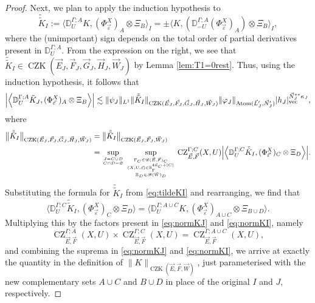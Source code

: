 \documentclass[11pt, reqno]{amsart}
\theoremstyle{definition}
\theoremstyle{remark}
\numberwithin{equation}{section}
\newcommand{\vE}{\vec E}
\newcommand{\vF}{\vec F}
\newcommand{\R}{\mathbb R}
\newcommand{\vn}{\vec n}
\newcommand{\eps}{\varepsilon}
\newcommand{\Bpair}[2]{\Big\langle #1, #2 \Big\rangle}
\newcommand{\abs}[1]{|#1|}
\newcommand{\Babs}[1]{\Big|#1\Big|}
\newcommand{\Norm}[2]{\|#1\|_{#2}}
\newcommand{\bNorm}[2]{\big\|#1\big\|_{#2}}
\begin{document}
\begin{proof}
Next, we plan to apply the induction hypothesis to
\begin{equation}\label{eq:tildeKI}
  \tilde{\tilde K}_I
  :=\Bpair{\mathbb D_U^{\Gamma;A} K}{ (\Phi_{\vec\eps}^X)_A\otimes\Xi_B}_I
  =\pm\Bpair{ K}{ (\mathbb D_{-U}^{\Gamma;A}(\Phi_{\vec\eps}^X)_A)\otimes\Xi_B}_I,
\end{equation}
where the (unimportant) sign depends on the total order of partial derivatives present in $\mathbb D_U^{\Gamma;A}$. From the expression on the right, we see that $\tilde{\tilde K}_I\in \operatorname{CZK}(\vE_J,\vF_J,\vec G_J,\vec H_J,\vec W_J)$ by Lemma \ref{lem:T1=0rest}. Thus, using the induction hypothesis, it follows that
\begin{equation*}
   \Babs{\Bpair{\mathbb D^{\Gamma;A}_U
  \tilde K_J
  }{(\Phi_{\vec\eps}^X)_A\otimes \Xi_B}}
  \lesssim
  \Norm{\psi_J}{L^1}\Norm{\tilde{\tilde K}_I}{\operatorname{CZK}(\vE_J,\vF_J,\vec G_J,\vec H_J,\vec W_J)}
  \Norm{\varphi_J}{\operatorname{Atom}(\vec L_J',\vec N_J')}\abs{h_J}_{\rm{vec}}^{\vec N_J^{**}\kappa_J},
\end{equation*}
where
\begin{equation}\label{eq:normKI}
\begin{split}
     \bNorm{\tilde{\tilde K}_I }{\operatorname{CZK}(\vE_J,\vF_J,\vec G_J,\vec H_J,\vec W_J)}
    &=\bNorm{\tilde{\tilde K}_I }{\operatorname{CZK}(\vE_J,\vF_J,\vec W_J)} \\
    &=\sup_{\genfrac{}{}{0pt}{}{J=C\cup D}{C\cap D=\varnothing}}
    \sup_{\genfrac{}{}{0pt}{}{\genfrac{}{}{0pt}{}{\Gamma_C\in\mathscr G(\vE,\vF)_C}{(X,U,\vec\eps)\in\R^{4\vn_C+\abs{C}}_{\Gamma}}}{
    \Xi_{D}\in \mathscr B(\vec W)_D}}
  \operatorname{CZ}_{\vE,\vF}^{\Gamma;C}(X,U)
  \Babs{\Bpair{\mathbb D^{\Gamma;C}_U
  \tilde{\tilde K}_I
  }{(\Phi_{\vec\eps}^X)_C\otimes \Xi_D}}.
\end{split}
\end{equation}
Substituting the formula for $\tilde{\tilde K}_I$ from \eqref{eq:tildeKI} and rearranging, we find that
\begin{equation*}
  \Bpair{\mathbb D^{\Gamma;C}_U   \tilde{\tilde K}_I  }{(\Phi_{\vec\eps}^X)_C\otimes \Xi_D}
  =\Bpair{\mathbb D^{\Gamma;A\cup C}_U K}{(\Phi_{\vec\eps}^X)_{A\cup C}\otimes\Xi_{B\cup D}}.
\end{equation*}
Multiplying this by the factors present in \eqref{eq:normKJ} and \eqref{eq:normKI}, namely
\begin{equation*}
  \operatorname{CZ}^{\Gamma;A}_{\vE,\vF}(X,U)\times
  \operatorname{CZ}^{\Gamma;C}_{\vE,\vF}(X,U)
  =\operatorname{CZ}^{\Gamma;A\cup C}_{\vE,\vF}(X,U),
\end{equation*}
and combining the suprema in \eqref{eq:normKJ} and \eqref{eq:normKI}, we arrive at exactly the quantity in the definition of $\Norm{K}{\operatorname{CZK}(\vE,\vF,\vec W)}$, just parameterised
with the new complementary sets $A\cup C$ and $B\cup D$ in place of the original $I$ and $J$, respectively.


\end{proof}
\end{document}

